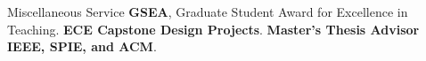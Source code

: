 \begin{rubric}{Miscellaneous Service}
\entry*[2020] \textbf{GSEA}, Graduate Student Award for Excellence in Teaching.
%
\entry*[2018-2023] \textbf{ECE Capstone Design Projects}. 
\entry*[2019-2020, 2023-2024] \textbf{Master's Thesis Advisor} 
%
\entry*[] \textbf{IEEE, SPIE, and ACM}.
%
\end{rubric}
